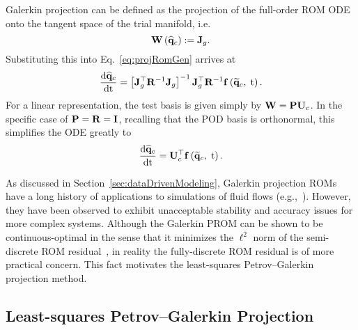 Galerkin projection can be defined as the projection of the full-order ROM ODE onto the tangent space of the trial manifold, i.e.
%
\begin{equation}
    \testBasis\left(\consVecCoef\right) \defEq \jacobDecode.
\end{equation}
%
Substituting this into Eq.~\ref{eq:projRomGen} arrives at
%
\begin{equation}\label{eq:galerkinROMODE}
    \ode{\consVecCoef}{\timeVar} = \left[\jacobDecode^\top \resScaleInv \jacobDecode\right]^{-1} \jacobDecode^\top \resScaleInv \rhsFunc{\consVecRom, \; \timeVar}.
\end{equation}
%
For a linear representation, the test basis is given simply by $\testBasis = \consScale \consTrial$. In the specific case of $\consScale = \resScale = \identMat$, recalling that the POD basis is orthonormal, this simplifies the ODE greatly to
%
\begin{equation}
    \ode{\consVecCoef}{\timeVar} = \consTrial^\top \rhsFunc{\consVecRom, \; \timeVar}.
\end{equation}

As discussed in Section~\ref{sec:dataDrivenModeling}, Galerkin projection ROMs have a long history of applications to simulations of fluid flows (e.g.,~\cite{Aubry1988,Cazemier1998,BuiThanh2007}). However, they have been observed to exhibit unacceptable stability and accuracy issues for more complex systems. Although the Galerkin PROM can be shown to be continuous-optimal in the sense that it minimizes the $\ell^2$ norm of the semi-discrete ROM residual~\cite{Carlberg2017}, in reality the fully-discrete ROM residual is of more practical concern. This fact motivates the least-squares Petrov--Galerkin projection method.

\subsection{Least-squares Petrov--Galerkin Projection}

